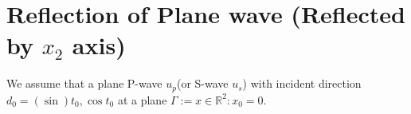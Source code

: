 \documentclass[12pt]{iopart}
\begin{document}
\newcommand{\mL}{\mathscr{L}}
\newcommand{\cT}{{\cal T}}
\newcommand{\cM}{{\cal M}}
\newcommand{\cE}{{\cal E}}
\newcommand{\cL}{{\cal L}}
\newcommand{\cF}{{\cal F}}
\newcommand{\cB}{{\cal B}}
\newcommand{\PML}{{\rm PML}}
\newcommand{\FEM}{{\rm FEM}}
\newcommand{\rd}{\,\mathrm{d}}

\renewcommand{\i}{\mathbf{i}}
\renewcommand{\v}{\mathbf{v}}
\renewcommand{\u}{\mathbf{u}}
\renewcommand{\r}{\mathbf{r}}
\newcommand{\gR}{{\mathbb{R}}}
\newcommand{\Z}{{\mathbb{Z}}}
\newcommand{\C}{{\mathbb{C}}}
\newcommand{\I}{{\mathbb{I}}}
\renewcommand{\Re}{\mathrm{Re}\,}
\renewcommand{\Im}{\mathrm{Im}\,}
\renewcommand{\div}{\mathrm{div}}
\newcommand{\curl}{\mathrm{curl}}
\newcommand{\Curl}{\mathbf{curl}}
\newcommand{\pv}{\mathrm{p.v.}}

\newcommand{\Np}{\mathbb{N}_p}
\newcommand{\Ns}{\mathbb{N}_s}
\newcommand{\Tp}{\mathbb{T}_p}
\newcommand{\Ts}{\mathbb{T}_s}
\newcommand{\Na}{\mathbb{N}_\alpha}
\newcommand{\Nb}{\mathbb{N}_\beta}
\newcommand{\Ta}{\mathbb{T}_\alpha}
\newcommand{\Tb}{\mathbb{T}_\beta}
\newcommand{\GG}{\mathcal{G}}

\newcommand{\N}{\mathbb{N}}
\newcommand{\D}{\mathbb{D}}
\newcommand{\T}{\mathbb{T}}
\newcommand{\A}{\mathbb{A}}
\newcommand{\B}{\mathbb{B}}
\newcommand{\G}{\mathbb{G}}
\newcommand{\F}{\mathbb{F}}
\newcommand{\R}{\mathbb{R}}
\newcommand{\W}{\mathbb{W}}
\newcommand{\V}{\mathbb{V}}
\newcommand{\U}{\mathbb{U}}
\newcommand{\J}{\mathbb{J}}
\newcommand{\Zg}{\mathbb{Z}}
\newcommand{\Gtheta}{\mathbb{\Theta}}
\newcommand{\Gphi}{\mathbb{\Phi}}

\newcommand{\be}{\begin{eqnarray}}
\newcommand{\ee}{\end{eqnarray}}
\newcommand{\ben}{\begin{eqnarray*}}
	\newcommand{\een}{\end{eqnarray*}}
\newcommand{\nn}{\nonumber}
\section{Reflection of Plane wave (Reflected by $x_2$ axis)}
We assume that a plane P-wave  $u_p$(or S-wave $u_s$) with incident direction $d_0=(\sin)t_0, \cos t_0$ at a plane $\Gamma := {x \in \R^2 :
	x _0 = 0}$.
\end{document}
